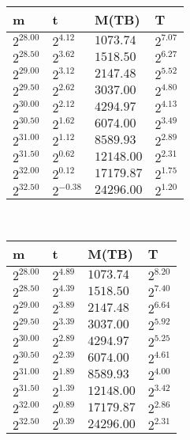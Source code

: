 \begin{tabular}{llll}
m & t & M(TB) & T \\ \hline
$2^{28.00}$ & $2^{4.12}$ & $1073.74$ & $2^{7.07}$ \\
$2^{28.50}$ & $2^{3.62}$ & $1518.50$ & $2^{6.27}$ \\
$2^{29.00}$ & $2^{3.12}$ & $2147.48$ & $2^{5.52}$ \\
$2^{29.50}$ & $2^{2.62}$ & $3037.00$ & $2^{4.80}$ \\
$2^{30.00}$ & $2^{2.12}$ & $4294.97$ & $2^{4.13}$ \\
$2^{30.50}$ & $2^{1.62}$ & $6074.00$ & $2^{3.49}$ \\
$2^{31.00}$ & $2^{1.12}$ & $8589.93$ & $2^{2.89}$ \\
$2^{31.50}$ & $2^{0.62}$ & $12148.00$ & $2^{2.31}$ \\
$2^{32.00}$ & $2^{0.12}$ & $17179.87$ & $2^{1.75}$ \\
$2^{32.50}$ & $2^{-0.38}$ & $24296.00$ & $2^{1.20}$ \\
\end{tabular}
 \ 
\begin{tabular}{llll}
m & t & M(TB) & T \\ \hline
$2^{28.00}$ & $2^{4.89}$ & $1073.74$ & $2^{8.20}$ \\
$2^{28.50}$ & $2^{4.39}$ & $1518.50$ & $2^{7.40}$ \\
$2^{29.00}$ & $2^{3.89}$ & $2147.48$ & $2^{6.64}$ \\
$2^{29.50}$ & $2^{3.39}$ & $3037.00$ & $2^{5.92}$ \\
$2^{30.00}$ & $2^{2.89}$ & $4294.97$ & $2^{5.25}$ \\
$2^{30.50}$ & $2^{2.39}$ & $6074.00$ & $2^{4.61}$ \\
$2^{31.00}$ & $2^{1.89}$ & $8589.93$ & $2^{4.00}$ \\
$2^{31.50}$ & $2^{1.39}$ & $12148.00$ & $2^{3.42}$ \\
$2^{32.00}$ & $2^{0.89}$ & $17179.87$ & $2^{2.86}$ \\
$2^{32.50}$ & $2^{0.39}$ & $24296.00$ & $2^{2.31}$ \\
\end{tabular}
 \ 
